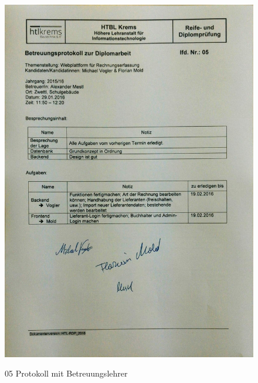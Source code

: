 \begin{figure}[!h]
    \centering
    \includegraphics[width=13cm]{figures/Mestl_05.jpg}
    \label{fig:05_Protokoll_Betreuungslehrer}
    \caption{05 Protokoll mit Betreuungslehrer}
\end{figure}
\newpage
